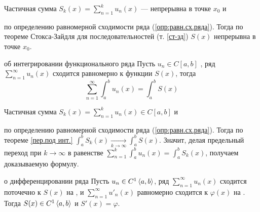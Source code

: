 \begin{prf} %
	Частичная сумма $S_k(x) = \sum\limits_{n = 1}^{k}u_n(x)$ --- непрерывна в точке $x_0$ и\! по определению равномерной сходимости ряда (\ref{опр:равн.сх.ряда}). Тогда по теореме Стокса-Зайдля для последовательностей (т. \ref{ст-зд}) $S(x)$ непрерывна в точке $x_0$. 
\end{prf} %

\begin{teor}[https://www.youtube.com/live/g4Zgeu8xe-Q?si=GEu4QG3yGOvet_UK&t=10772]{об интегрировании функционального ряда}
	Пусть $u_n \in C[a, b]$ , ряд $\sum\limits_{n = 1}^{\infty}u_n(x)$ сходится равномерно к функции $S(x)$, тогда \[\sum_{n = 1}^{\infty} \int_a^b u_n(x) = \int_a^b S(x)\]
\end{teor} %

\begin{prf} %
		Частичная сумма $S_k(x) = \sum\limits_{n = 1}^{k}u_n(x) \in C[a, b]$ и\!
		по определению равномерной сходимости ряда (\ref{опр:равн.сх.ряда}). Тогда по теореме \ref{пер.под инт.} $\int_a^b S_k(x) \xrightarrow[k \to \infty]{} \int_a^b S(x)$. 
		Значит, делая предельный переход при $k \to \infty$ в равенстве $\sum\limits_{n = 1}^{k}\int_a^b u_n(x) = \int_a^b S_k(x)$, получаем доказываемую формулу. 
\end{prf} %

\begin{teor}[https://www.youtube.com/live/g4Zgeu8xe-Q?si=VKzpWKydqsZrl_u4&t=12003]{о дифференцировании ряда}\label{дифф.ряда}
	Пусть $u_n\in C^1 \left<a, b\right>$, ряд $\sum\limits_{n = 1}^{\infty} u_n(x)$ сходится поточечно к $S(x)$ на , и $\sum\limits_{n = 1}^{\infty} u'_n(x)$ равномерно сходится к $\varphi(x)$ на . Тогда $S(x) \in C^1\left<a,b\right>$ и $S'(x) = \varphi$.
\end{teor} %

